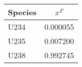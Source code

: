 \begin{tabular}{|l||c|}
\hline
\bf{Species} & \bf{$x^F$} \\ 
\hline
U234 & 0.000055 \\ 
\hline
U235 & 0.007200 \\ 
\hline
U238 & 0.992745 \\ 
\hline
\end{tabular}
